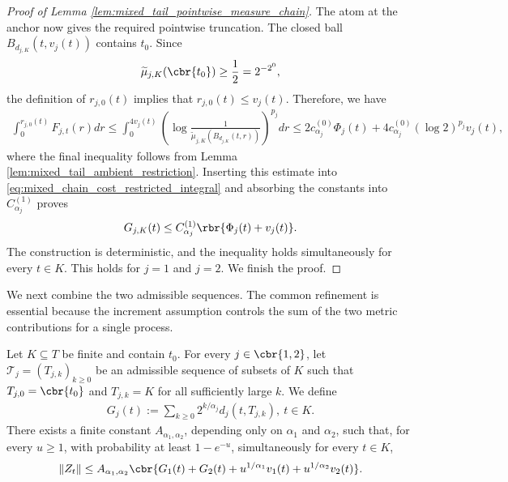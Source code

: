 \documentclass[11pt]{article}
\begin{document}
\begin{proof}[Proof of Lemma
\ref{lem:mixed_tail_pointwise_measure_chain}]
The atom at the anchor now gives the required pointwise truncation.
The closed ball $B_{d_{j,K}}(t,v_j(t))$ contains $t_0$. Since
\begin{align*}
\widetilde\mu_{j,K}(\cbr{t_0})\ge\frac12=2^{-2^0},
\end{align*}
the definition of $r_{j,0}(t)$ implies that $r_{j,0}(t)\le v_j(t)$.
Therefore, we have
\begin{align*}
\int_0^{r_{j,0}(t)}F_{j,t}(r)dr\le
\int_0^{4v_j(t)}
\left(
\log\frac{1}{
\widetilde\mu_{j,K}(B_{d_{j,K}}(t,r))
}
\right)^{p_j}dr\le
2c_{\alpha_j}^{(0)}\Phi_j(t)
+
4c_{\alpha_j}^{(0)}
(\log2)^{p_j}v_j(t),
\end{align*}
where the final inequality follows from
Lemma \ref{lem:mixed_tail_ambient_restriction}. Inserting this estimate
into \eqref{eq:mixed_chain_cost_restricted_integral} and absorbing the
constants into $C_{\alpha_j}^{(1)}$ proves
\begin{align*}
G_{j,K}(t)
\le
C_{\alpha_j}^{(1)}
\rbr{\Phi_j(t)+v_j(t)}.
\end{align*}
The construction is deterministic, and the inequality holds
simultaneously for every $t\in K$. This holds for $j=1$ and $j=2$. We finish the proof.
\end{proof}

We next combine the two admissible sequences. The common refinement is essential because the increment assumption controls the sum of the two
metric contributions for a single process.

\begin{lemma}
\label{lem:mixed_tail_finite_pointwise}
Let $K\subseteq T$ be finite and contain $t_0$. For every
$j\in\cbr{1,2}$, let $\mathcal T_j=(T_{j,k})_{k\ge0}$ be an admissible sequence of subsets of $K$ such that $T_{j,0}=\cbr{t_0}$ and $T_{j,k}=K$ for all sufficiently large $k$. We define
\begin{align*}
G_j(t)
:=
\sum_{k\ge0}
2^{k/\alpha_j}d_j(t,T_{j,k}),
\ t\in K.
\end{align*}
There exists a finite constant $A_{\alpha_1,\alpha_2}$, depending only
on $\alpha_1$ and $\alpha_2$, such that, for every $u\ge1$, with
probability at least $1-e^{-u}$, simultaneously for every $t\in K$,
\begin{align*}
\|Z_t\|
\le
A_{\alpha_1,\alpha_2}
\cbr{
G_1(t)+G_2(t)
+
u^{1/\alpha_1}v_1(t)
+
u^{1/\alpha_2}v_2(t)
}.
\end{align*}
\end{lemma}
\end{document}

